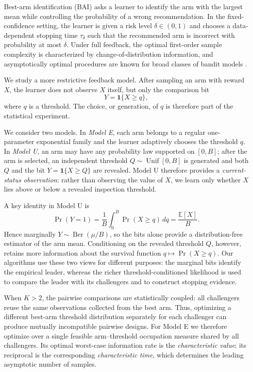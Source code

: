 \documentclass[twoside]{article}
\theoremstyle{definition}
\newcommand{\E}{\mathbb E}
\newcommand{\1}{\mathbf 1}
\begin{document}
Best-arm identification (BAI) asks a learner to identify the arm with the
largest mean while controlling the probability of a wrong recommendation.
In the fixed-confidence setting, the learner is given a risk level
$\delta\in(0,1)$ and chooses a data-dependent stopping time
$\tau_\delta$ such that the recommended arm is incorrect with probability at
most $\delta$. Under full feedback, the optimal first-order sample complexity
is characterized by change-of-distribution information, and asymptotically
optimal procedures are known for broad classes of bandit models
\cite{KCG2016,Jourdan2022}.

We study a more restrictive feedback model. After sampling an arm with reward
$X$, the learner does not observe $X$ itself, but only the comparison bit
\[
Y=\mathbf 1\{X\ge q\},
\]
where $q$ is a threshold. The choice, or generation, of $q$ is therefore part
of the statistical experiment.

We consider two models. In \emph{Model E}, each arm belongs to a regular
one-parameter exponential family and the learner adaptively chooses the
threshold $q$. In \emph{Model U}, an arm may have any probability law
supported on $[0,B]$; after the arm is selected, an independent threshold
$Q\sim\operatorname{Unif}[0,B]$ is generated and both $Q$ and the bit
$Y=\mathbf 1\{X\ge Q\}$ are revealed. Model U therefore provides a
\emph{current-status observation}: rather than observing the value of $X$, we
learn only whether $X$ lies above or below a revealed inspection threshold.

A key identity in Model U is
\[
\Pr(Y=1)
=
\frac{1}{B}\int_0^B\Pr(X\ge q)\,dq
=
\frac{\E[X]}{B}.
\]
Hence marginally $Y\sim\operatorname{Ber}(\mu/B)$, so the bits alone provide
a distribution-free estimator of the arm mean. Conditioning on the revealed
threshold $Q$, however, retains more information about the survival function
$q\mapsto\Pr(X\ge q)$. Our algorithms use these two views for different
purposes: the marginal bits identify the empirical leader, whereas the richer
threshold-conditioned likelihood is used to compare the leader with its
challengers and to construct stopping evidence.

When $K>2$, the pairwise comparisons are statistically coupled: all
challengers reuse the same observations collected from the best arm. Thus,
optimizing a different best-arm threshold distribution separately for each
challenger can produce mutually incompatible pairwise designs. For Model E we
therefore optimize over a single feasible arm--threshold occupation measure
shared by all challengers. Its optimal worst-case information rate is the
\emph{characteristic value}; its reciprocal is the corresponding
\emph{characteristic time}, which determines the leading asymptotic number of
samples.
\end{document}
